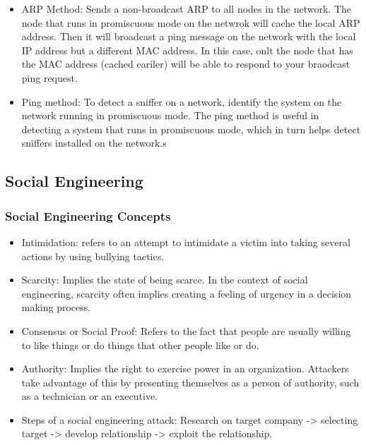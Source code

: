 \begin{itemize}
\begin{itemize}
        \item ARP Method: Sends a non-broadcast ARP to all nodes in the network. The node that runs in promiscuous mode on the netwrok will cache the local ARP address. Then it will broadcast a ping message on the network with the local IP address but a different MAC address. In this case, onlt the node that has the MAC address (cached eariler) will be able to respond to your braodcast ping request.
        \item Ping method: To detect a sniffer on a network, identify the system on the network running in promiscuous mode. The ping method is useful in detecting a system that runs in promiscuous mode, which in turn helps detect sniffers installed on the network.s
    \end{itemize}
\end{itemize}

\subsection{Social Engineering}
\subsubsection{Social Engineering Concepts}
\begin{itemize}
    \item Intimidation: refers to an attempt to intimidate a victim into taking several actions by using bullying tactics.
    \item Scarcity: Implies the state of being scarce. In the context of social engineering, scarcity often implies creating a feeling of urgency in a decision making process.
    \item Consensus or Social Proof: Refers to the fact that people are usually willing to like things or do things that other people like or do.
    \item Authority: Implies the right to exercise power in an organization. Attackers take advantage of this by presenting themselves as a person of authority, such as a technician or an executive.
    \item Steps of a social engineering attack: Research on target company -> selecting target -> develop relationship -> exploit the relationship.
\end{itemize}

